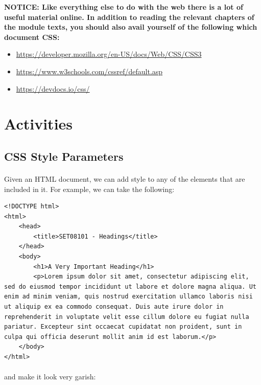 \documentclass[10pt, a4paper, twosize]{article}
\begin{document}
\begin{framed}
{\bf{NOTICE:} Like everything else to do with the web there is a lot of useful material online. In addition to reading the relevant chapters of the module texts, you should also avail yourself of the following which document CSS:
\begin{itemize}
\item \url{https://developer.mozilla.org/en-US/docs/Web/CSS/CSS3}
\item \url{https://www.w3schools.com/cssref/default.asp}
\item \url{https://devdocs.io/css/}
\end{itemize}

}
\end{framed}


\section{Activities}

\subsection{CSS Style Parameters}
\paragraph{} Given an HTML document, we can add style to any of the elements that are included in it. For example, we can take the following:

\begin{lstlisting}
<!DOCTYPE html>
<html>
    <head>
        <title>SET08101 - Headings</title>
    </head>
    <body>
        <h1>A Very Important Heading</h1>
        <p>Lorem ipsum dolor sit amet, consectetur adipiscing elit, sed do eiusmod tempor incididunt ut labore et dolore magna aliqua. Ut enim ad minim veniam, quis nostrud exercitation ullamco laboris nisi ut aliquip ex ea commodo consequat. Duis aute irure dolor in reprehenderit in voluptate velit esse cillum dolore eu fugiat nulla pariatur. Excepteur sint occaecat cupidatat non proident, sunt in culpa qui officia deserunt mollit anim id est laborum.</p>
    </body>
</html>
\end{lstlisting}

\paragraph{} and make it look very garish:
\end{document}
